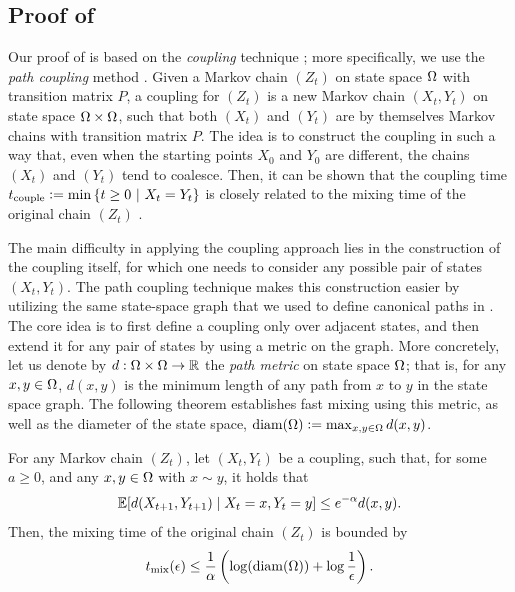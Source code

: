 \subsection{Proof of }
Our proof of  is based on the \emph{coupling} technique \citep{aldous83}; more specifically, we use the \emph{path coupling} method \citep{bubley97,levin08,jerrum03}.
Given a Markov chain $(Z_t)$ on state space $\ss$ with transition matrix $P$, a coupling for $(Z_t)$ is a new Markov chain $(X_t, Y_t)$ on state space $\ss \times \ss$, such that both $(X_t)$ and $(Y_t)$ are by themselves Markov chains with transition matrix $P$.
The idea is to construct the coupling in such a way that, even when the starting points $X_0$ and $Y_0$ are different, the chains $(X_t)$ and $(Y_t)$ tend to coalesce.
Then, it can be shown that the coupling time $t_{\mathrm{couple}} \defeq \min\sdef{t \geq 0}{X_t = Y_t}$ is closely related to the mixing time of the original chain $(Z_t)$ \citep{levin08}.

The main difficulty in applying the coupling approach lies in the construction of the coupling itself, for which one needs to consider any possible pair of states $(X_t, Y_t)$.
The path coupling technique makes this construction easier by utilizing the same state-space graph that we used to define canonical paths in .
The core idea is to first define a coupling only over adjacent states, and then extend it for any pair of states by using a metric on the graph.
More concretely, let us denote by $d : \ss \times \ss \to \mathbb{R}$ the \emph{path metric} on state space $\ss$; that is, for any $x, y \in \ss$, $d(x, y)$ is the minimum length of any path from $x$ to $y$ in the state space graph.
The following theorem establishes fast mixing using this metric, as well as the diameter of the state space, $\mathrm{diam}(\ss) \defeq \max_{x,y \in \ss}d(x, y)$.
\begin{theorem} \label{thm:pc}
For any Markov chain $(Z_t)$, let $(X_t, Y_t)$ be a coupling, such that, for some $a \geq 0$, and any $x, y \in \ss$ with $x \sim y$, it holds that
\begin{align*}
  \E[d(X_{t+1}, Y_{t+1}) \mid X_t = x, Y_t = y] \leq e^{-\alpha}d(x, y).
\end{align*}
Then, the mixing time of the original chain $(Z_t)$ is bounded by
\begin{align*}
  \tme \leq \frac{1}{\alpha}\left(\log(\mathrm{diam}(\ss)) + \log\frac{1}{\epsilon} \right).
\end{align*}
\end{theorem}

